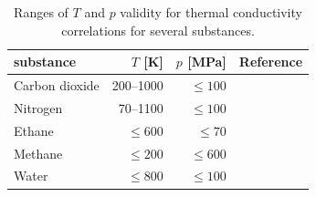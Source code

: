 \begin{table}[H]
 \caption{\label{tab-eos-hc}Ranges of $T$ and $p$ validity for thermal conductivity correlations for several substances.}
 \begin{center}
  \begin{tabular}{lrrl}
 \toprule
   substance 		& $T$ [K] 		& $p$ [MPa] 			& Reference \\
  \midrule
  Carbon dioxide 	& 200--1000		& $\leq{100}$ 			& \cite{FenWakVes:98}\\
  Nitrogen       	& 70--1100		& $\leq{100}$		 	& \cite{SteKraLae:87}\\  
  Ethane         	& $\leq{600}$	& $\leq{70}$		 	& \cite{YouEly:87}\\ 
  Methane       	& $\leq{200}$ 	& $\leq{600}$		 	& \cite{YouEly:87}\\  
  Water          	& $\leq{800}$ 	& $\leq{100}$		 	& \cite{IAPWS:08b}\\
  \bottomrule
 \end{tabular}
 \end{center}
\end{table}




